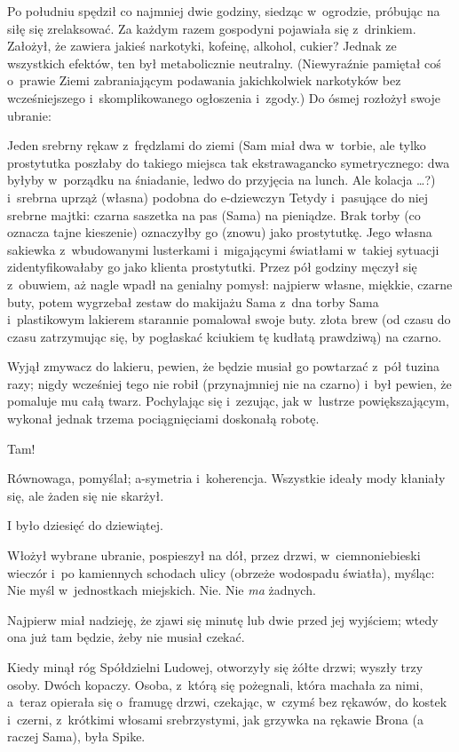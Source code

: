 \documentclass[oneside,polish,11pt,rmheadings]{mwbk}
\begin{document}
Po południu spędził co najmniej dwie godziny, siedząc w~ogrodzie, próbując na siłę się zrelaksować. Za każdym razem gospodyni pojawiała się z~drinkiem. Założył, że zawiera jakieś narkotyki, kofeinę, alkohol, cukier? Jednak ze wszystkich efektów, ten był metabolicznie neutralny. (Niewyraźnie pamiętał coś o~prawie Ziemi zabraniającym podawania jakichkolwiek narkotyków bez wcześniejszego i~skomplikowanego ogłoszenia i~zgody.) Do ósmej rozłożył swoje ubranie: 

Jeden srebrny rękaw z~frędzlami do ziemi (Sam miał dwa w~torbie, ale tylko prostytutka poszłaby do takiego miejsca tak ekstrawagancko symetrycznego: dwa byłyby w~porządku na śniadanie, ledwo do przyjęcia na lunch. Ale kolacja \ldots ?) i~srebrna uprząż (własna) podobna do e-dziewczyn Tetydy i~pasujące do niej srebrne majtki: czarna saszetka na pas (Sama) na pieniądze. Brak torby (co oznacza tajne kieszenie) oznaczyłby go (znowu) jako prostytutkę. Jego własna sakiewka z~wbudowanymi lusterkami i~migającymi światłami w~takiej sytuacji zidentyfikowałaby go jako klienta prostytutki. Przez pół godziny męczył się z~obuwiem, aż nagle wpadł na genialny pomysł: najpierw własne, miękkie, czarne buty, potem wygrzebał zestaw do makijażu Sama z~dna torby Sama i~plastikowym lakierem starannie pomalował swoje buty. złota brew (od czasu do czasu zatrzymując się, by pogłaskać kciukiem tę kudłatą prawdziwą) na czarno. 

Wyjął zmywacz do lakieru, pewien, że będzie musiał go powtarzać z~pół tuzina razy; nigdy wcześniej tego nie robił (przynajmniej nie na czarno) i~był pewien, że pomaluje mu całą twarz. Pochylając się i~zezując, jak w~lustrze powiększającym, wykonał jednak trzema pociągnięciami doskonałą robotę. 

Tam! 

Równowaga, pomyślał; a-symetria i~koherencja. Wszystkie ideały mody kłaniały się, ale żaden się nie skarżył. 

I było dziesięć do dziewiątej. 

Włożył wybrane ubranie, pospieszył na dół, przez drzwi, w~ciemnoniebieski wieczór i~po kamiennych schodach ulicy (obrzeże wodospadu światła), myśląc: Nie myśl w~jednostkach miejskich. Nie. Nie \textit{ma }żadnych. 

Najpierw miał nadzieję, że zjawi się minutę lub dwie przed jej wyjściem; wtedy ona już tam będzie, żeby nie musiał czekać. 

Kiedy minął róg Spółdzielni Ludowej, otworzyły się żółte drzwi; wyszły trzy osoby. Dwóch kopaczy. Osoba, z~którą się pożegnali, która machała za nimi, a~teraz opierała się o~framugę drzwi, czekając, w~czymś bez rękawów, do kostek i~czerni, z~krótkimi włosami srebrzystymi, jak grzywka na rękawie Brona (a raczej Sama), była Spike. 
\end{document}
